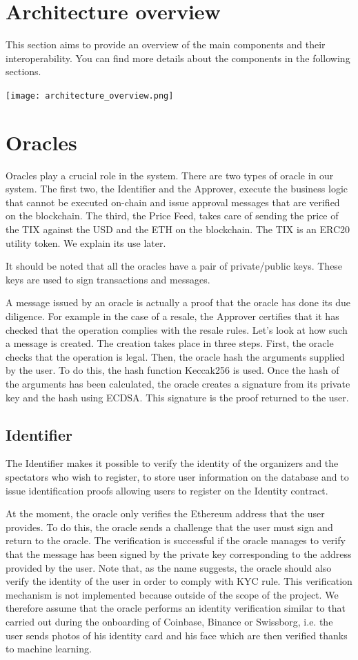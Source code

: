 \documentclass[a4paper,11pt,oneside]{report}
\begin{document}
\section{Architecture overview}
This section aims to provide an overview of the main components and their interoperability. You can find more details about the components in the following sections.

\texttt{[image: architecture\_overview.png]}

\section{Oracles}
Oracles play a crucial role in the system. There are two types of oracle in our system. The first two, the Identifier and the Approver, execute the business logic that cannot be executed on-chain and issue approval messages that are verified on the blockchain. The third, the Price Feed, takes care of sending the price of the TIX against the USD and the ETH on the blockchain. The TIX is an ERC20 utility token. We explain its use later.

It should be noted that all the oracles have a pair of private/public keys. These keys are used to sign transactions and messages.

A message issued by an oracle is actually a proof that the oracle has done its due diligence. For example in the case of a resale, the Approver certifies that it has checked that the operation complies with the resale rules. Let's look at how such a message is created. The creation takes place in three steps. First, the oracle checks that the operation is legal. Then, the oracle hash the arguments supplied by the user. To do this, the hash function Keccak256 is used. Once the hash of the arguments has been calculated, the oracle creates a signature from its private key and the hash using ECDSA. This signature is the proof returned to the user.

\subsection{Identifier}
The Identifier makes it possible to verify the identity of the organizers and the spectators who wish to register, to store user information on the database and to issue identification proofs allowing users to register on the Identity contract.

At the moment, the oracle only verifies the Ethereum address that the user provides. To do this, the oracle sends a challenge that the user must sign and return to the oracle. The verification is successful if the oracle manages to verify that the message has been signed by the private key corresponding to the address provided by the user. Note that, as the name suggests, the oracle should also verify the identity of the user in order to comply with KYC rule. This verification mechanism is not implemented because outside of the scope of the project. We therefore assume that the oracle performs an identity verification similar to that carried out during the onboarding of Coinbase, Binance or Swissborg, i.e. the user sends photos of his identity card and his face which are then verified thanks to machine learning.
\end{document}
